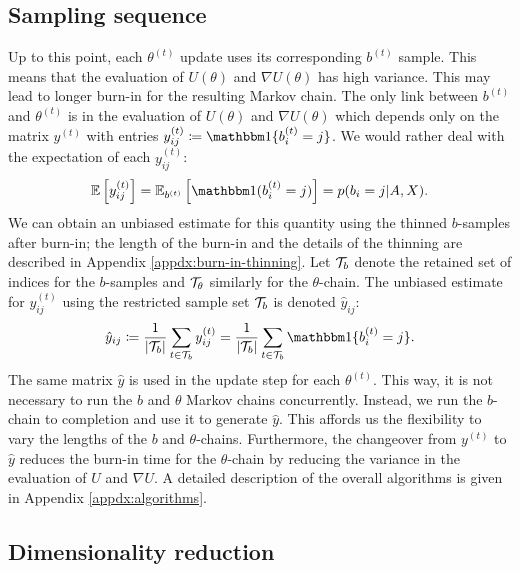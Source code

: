 \subsection{Sampling sequence}
\label{s:ss}

Up to this point, each $\theta^{(t)}$ update uses its corresponding $b^{(t)}$ sample. This means that the evaluation of $U(\theta)$ and $\nabla U(\theta)$ has high variance. This may lead to longer burn-in for the resulting Markov chain. The only link between $b^{(t)}$ and $\theta^{(t)}$ is in the evaluation of $U(\theta)$ and $\nabla U(\theta)$ which depends only on the matrix $y^{(t)}$ with entries $y_{ij}^{(t)} \coloneqq \one\{b_i^{(t)} = j\}$. We would rather deal with the expectation of each $y_{ij}^{(t)}$:
%
\begin{equation}
	\Expect \left[ y_{ij}^{(t)} \right] = \Expect_{b^{(t)}} \left[ \one(b_{i}^{(t)} = j) \right]
	= p(b_i = j | A, X).
\end{equation}
%
We can obtain an unbiased estimate for this quantity using 
the thinned $b$-samples after burn-in; the length of the
burn-in and the details of the thinning are described
in Appendix \ref{appdx:burn-in-thinning}.
Let $\mathcal{T}_b$  denote the retained set of indices 
for the $b$-samples and $\mathcal{T}_\theta$ similarly for the $\theta$-chain. 
The unbiased estimate for $y_{ij}^{(t)}$ using the 
restricted sample set $\mathcal{T}_b$ is denoted $\hat{y}_{ij}$:
%
\begin{equation}
	\hat{y}_{ij} \coloneqq \frac{1}{|\Tcal_b|} \sum_{t \in \Tcal_b} y_{ij}^{(t)} = \frac{1}{|\Tcal_b|} \sum_{t \in \Tcal_b} \one\{b_i^{(t)} = j\}.
	\label{eqn:y-hat}
\end{equation}
%
The same matrix $\hat{y}$ is used in the update step
for each $\theta^{(t)}$.
This way, it is not necessary to run the $b$ and $\theta$ Markov chains 
concurrently. Instead, we run the $b$-chain to completion and use it 
to generate $\hat{y}$. This affords us the flexibility to vary the 
lengths of the $b$ and $\theta$-chains. Furthermore, the changeover 
from $y^{(t)}$ to $\hat{y}$ reduces the burn-in time for 
the $\theta$-chain by reducing the variance in the evaluation 
of $U$ and $\nabla U$. A detailed description of the overall 
algorithms is given in Appendix \ref{appdx:algorithms}.

\subsection{Dimensionality reduction}
\label{sec:dim-reduction}

